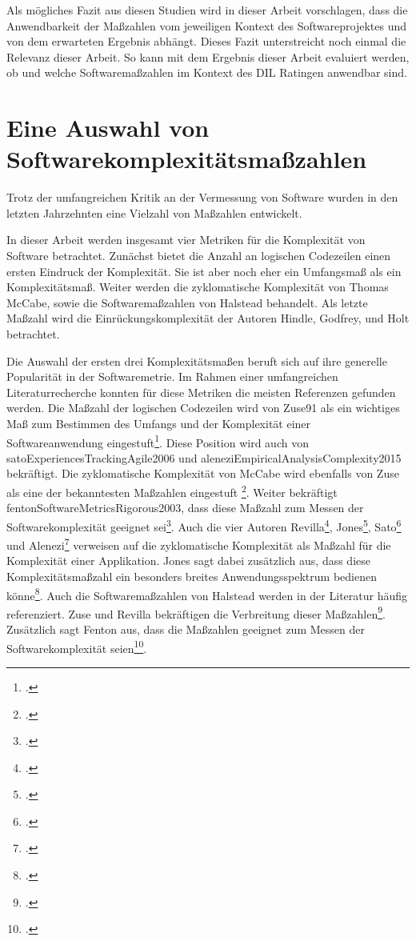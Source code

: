 Als mögliches Fazit aus diesen Studien wird in dieser Arbeit
vorschlagen, dass die Anwendbarkeit der Maßzahlen vom jeweiligen Kontext
des Softwareprojektes und von dem erwarteten Ergebnis abhängt. Dieses
Fazit unterstreicht noch einmal die Relevanz dieser Arbeit. So kann mit
dem Ergebnis dieser Arbeit evaluiert werden, ob und welche
Softwaremaßzahlen im Kontext des DIL Ratingen anwendbar sind.

\section{Eine Auswahl von Softwarekomplexitätsmaßzahlen}\label{eine-auswahl-von-softwarekomplexitatsmasszahlen}

Trotz der umfangreichen Kritik an der Vermessung von Software wurden in
den letzten Jahrzehnten eine Vielzahl von Maßzahlen entwickelt.

In dieser Arbeit werden insgesamt vier Metriken für die Komplexität von
Software betrachtet. Zunächst bietet die Anzahl an logischen Codezeilen
einen ersten Eindruck der Komplexität. Sie ist aber noch eher ein
Umfangsmaß als ein Komplexitätsmaß. Weiter werden die zyklomatische
Komplexität von Thomas McCabe, sowie die Softwaremaßzahlen von Halstead
behandelt. Als letzte Maßzahl wird die Einrückungskomplexität der
Autoren Hindle, Godfrey, und Holt betrachtet.

Die Auswahl der ersten drei Komplexitätsmaßen beruft sich auf ihre
generelle Popularität in der Softwaremetrie. Im Rahmen einer
umfangreichen Literaturrecherche konnten für diese Metriken die meisten
Referenzen gefunden werden. Die Maßzahl der logischen Codezeilen wird
von Zuse91 als ein wichtiges Maß zum Bestimmen des Umfangs und der
Komplexität einer Softwareanwendung eingestuft\footcite[Vgl. ][]{Zuse 91 S. 145}.
Diese Position wird auch von satoExperiencesTrackingAgile2006 und
aleneziEmpiricalAnalysisComplexity2015 bekräftigt. Die zyklomatische
Komplexität von McCabe wird ebenfalls von Zuse als eine der bekanntesten
Maßzahlen eingestuft \footcite[Vgl. ][]{Zuse 91 S. 145}. Weiter bekräftigt
fentonSoftwareMetricsRigorous2003, dass diese Maßzahl zum Messen der
Softwarekomplexität geeignet sei\footcite[Vgl. ][]{fentonSoftwareMetricsRigorous2003
  S. 31}. Auch die vier Autoren Revilla\footcite[Vgl. ][]{Revilla 2007:203},
Jones\footcite[Vgl. ][]{Jones 2008:S. 335, 627, 449}, Sato\footcite[Vgl. ][]{satoExperiencesTrackingAgile2006}
und Alenezi\footcite[Vgl. ][]{aleneziEmpiricalAnalysisComplexity2015} verweisen
auf die zyklomatische Komplexität als Maßzahl für die Komplexität einer
Applikation. Jones sagt dabei zusätzlich aus, dass diese
Komplexitätsmaßzahl ein besonders breites Anwendungsspektrum bedienen
könne\footcite[Vgl. ][]{Jones 2008:S. 335, 627, 449}. Auch die Softwaremaßzahlen
von Halstead werden in der Literatur häufig referenziert. Zuse und
Revilla bekräftigen die Verbreitung dieser Maßzahlen\footcite[Vgl. ][]{Zuse 91 S.
  145, Revilla 2007:203}. Zusätzlich sagt Fenton aus, dass die Maßzahlen
geeignet zum Messen der Softwarekomplexität seien\footcite[Vgl. ][]{fentonSoftwareMetricsRigorous2003
  S. 31}.

